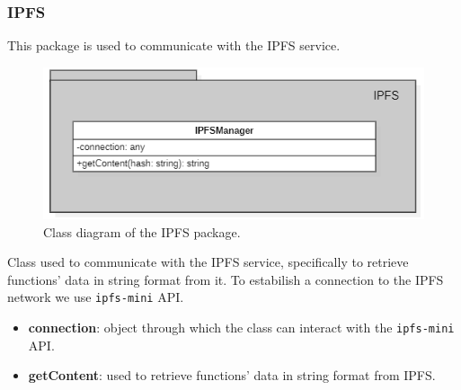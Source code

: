 	\subsubsection{IPFS}
	This package is used to communicate with the IPFS service.
	\begin{figure} [h!]
		\centering
		\includegraphics[width=0.8\linewidth]{diagrammi/etherless-server/IPFS}
		\caption{Class diagram of the IPFS package.}
	\end{figure}
	Class used to communicate with the IPFS service, specifically to retrieve functions' data in string format from it. To estabilish a connection to the IPFS network we use \texttt{ipfs-mini} API. 
	\begin{itemize}
		\item \textbf{connection}: object through which the class can interact with the \texttt{ipfs-mini} API.
	\end{itemize}
	\begin{itemize}
		\item \textbf{getContent}: used to retrieve functions' data in string format from IPFS.
	\end{itemize}
